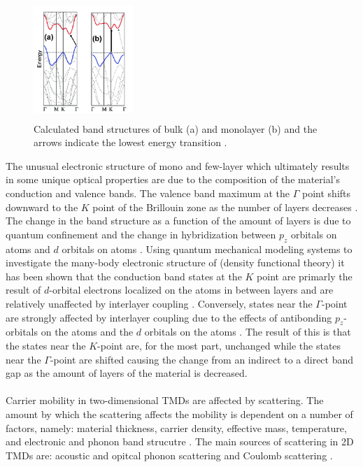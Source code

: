\documentclass[%
 reprint,
 amsmath,amssymb,
 aps,
pra,
floatfix,
]{revtex4-1}
\begin{document}
\begin{figure}
\includegraphics[height=4.5cm, width=3.75cm]{../figs/mos2bandgap}
\caption{Calculated band structures of bulk (a) and monolayer (b)  and the arrows indicate the lowest energy transition \cite{Splendiani2010}.}
\label{fig:mos2bandgap}
\end{figure}
The unusual electronic structure of mono and few-layer  which ultimately results in some unique optical properties are due to the composition of the material's conduction and valence bands. The valence band maximum at the $\Gamma$ point shifts downward to the $K$ point of the Brillouin zone as the number of layers decreases \cite{Mak2010, Splendiani2010}. The change in the band structure as a function of the amount of layers is due to quantum confinement and the change in hybridization between $p_z$ orbitals on  atoms and $d$ orbitals on  atoms \cite{Li2007, Mak2010, Splendiani2010}. Using quantum mechanical modeling systems to investigate the many-body electronic structure of  (density functional theory) it has been shown that the conduction band states at the $K$ point are primarly the result of $d$-orbital electrons localized on the  atoms in between layers and are relatively unaffected by interlayer coupling \cite{Kohn1964, Wang2012a}. Conversely, states near the $\Gamma$-point are strongly affected by interlayer coupling due to the effects of antibonding $p_z$-orbitals on the  atoms and the $d$ orbitals on the  atoms \cite{Splendiani2010}. The result of this is that the states near the $K$-point are, for the most part, unchanged while the states near the $\Gamma$-point are shifted causing the change from an indirect to a direct band gap as the amount of layers of the material is decreased. 
\\ \\
Carrier mobility in two-dimensional TMDs are affected by scattering. The amount by which the scattering affects the mobility is dependent on a number of factors, namely: material thickness, carrier density, effective mass, temperature, and electronic and phonon band strucutre \cite{Wang2012a}. The main sources of scattering in 2D TMDs are: acoustic and opitcal phonon scattering and Coulomb scattering \cite{Ando1982, Ridley1982}. 
\end{document}
